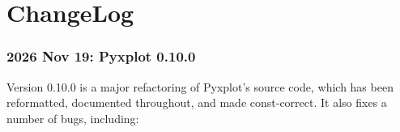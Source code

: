 %
%
%
%
%



\chapter{ChangeLog}

\subsection*{2026 Nov 19: Pyxplot 0.10.0}

Version 0.10.0 is a major refactoring of Pyxplot's source code, which has been reformatted, documented throughout, and made const-correct. It also fixes a number of bugs, including:

